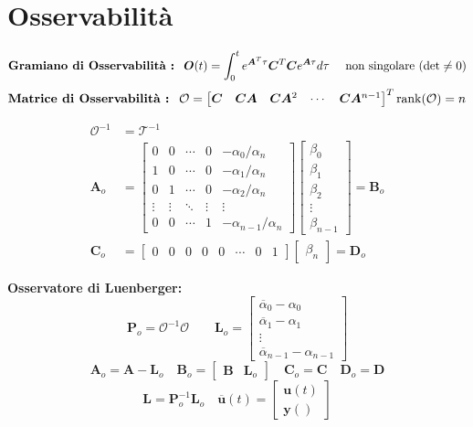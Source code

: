 \documentclass[a4paper]{article}
\renewcommand{\vec}{\bm}
\begin{document}
	\section*{Osservabilità}
	\[
		\text{\textbf{Gramiano di Osservabilità :} }\ \vec{O}(t) = \int_0^t e^{\vec{A}^T\tau}\vec{C}^T\vec{C}e^{\vec{A}\tau}d\tau\quad
		\text{ non singolare } (\det \neq 0)
	\]
	\[
	\text{\textbf{Matrice di Osservabilità :} }\
		\mathcal{O} =
		\begin{bmatrix}
			\vec{C} &\vec{C}\vec{A} & \vec{C}\vec{A}^2 & \cdots & \vec{C}\vec{A}^{n-1} 
		\end{bmatrix}^T
		\rank (\mathcal{O}) = n
	\]
	\begin{multicols}{2}
		\begin{align*}
			\mathcal{O}^{-1} &= \mathcal{T}^{-1} \\
			\vec{A}_o &=
			\begin{bmatrix}
				0 & 0 & \cdots & 0 & -\alpha_0/\alpha_n \\
				1 & 0 & \cdots & 0 & -\alpha_1/\alpha_n \\
				0 & 1 & \cdots & 0 & -\alpha_2/\alpha_n \\
				\vdots & \vdots & \ddots & \vdots & \vdots \\
				0 & 0 & \cdots & 1 & -\alpha_{n-1}/\alpha_n
			\end{bmatrix}
			\begin{bmatrix}
				\beta_0 \\
				\beta_1 \\
				\beta_2 \\
				\vdots \\
				\beta_{n-1}
			\end{bmatrix}
			= \vec{B}_o \\
			\vec{C}_o &=
			\begin{bmatrix}
				0 & 0 & 0 & 0 & 0 & \cdots & 0 & 1  
			\end{bmatrix}
			\begin{bmatrix}
				\beta_n
			\end{bmatrix}
			= \vec{D}_o
		\end{align*}
		\columnbreak
		
		\textbf{Osservatore di Luenberger:}
		\[
			\vec{P}_o = \mathcal{O}^{-1} \mathcal{O} \qquad
			\vec{L}_o =
			\begin{bmatrix}
				\overline{\alpha}_0 - \alpha_0 \\ 
				\overline{\alpha}_1 - \alpha_1 \\
				\vdots \\
				\overline{\alpha}_{n-1} - \alpha_{n-1}
			\end{bmatrix}
		\]
		\[
			\vec{A}_o = \vec{A} - \vec{L}_o \quad
			\vec{B}_o =
			\begin{bmatrix}
				\vec{B} & \vec{L}_o
			\end{bmatrix}\quad
			\vec{C}_o = \vec{C}\quad \vec{D}_o = \vec{D}
		\]
		\[
			\vec{L} = \vec{P}_o^{-1}\vec{L}_o \quad
			\overline{\vec{u}} (t) = 
			\begin{bmatrix}
				\vec{u}(t) \\
				\vec{y}()
			\end{bmatrix}
		\]
		
	\end{multicols}
\end{document}
